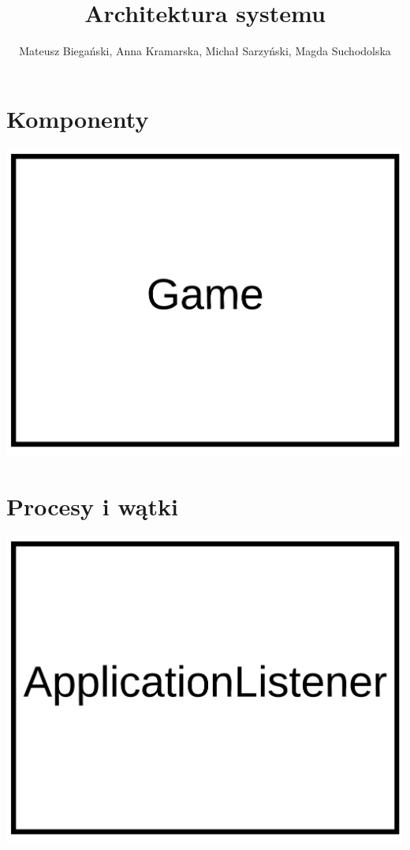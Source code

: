 \documentclass{article}
\begin{document}
\title{Architektura systemu}

\author{Mateusz Biegański, Anna Kramarska, Michał Sarzyński, Magda Suchodolska}
\maketitle

\section{Komponenty}
\begin{center}
    \includegraphics[scale=0.05]{developmentview.png}
\end{center}

\section{Procesy i wątki}
\begin{center}
    \includegraphics[scale=0.05]{processview.png}
\end{center}
\end{document}
